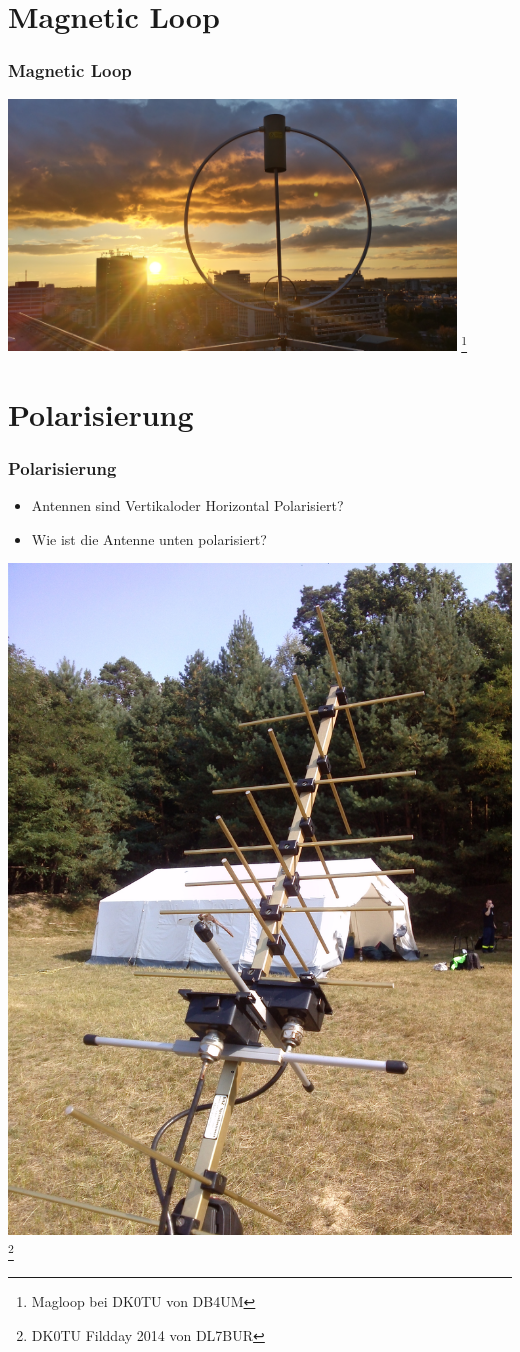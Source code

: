\section*{Magnetic Loop}

\begin{frame}
    \frametitle{Magnetic Loop}
    \begin{center}
        \includegraphics[width=0.89\textwidth]{e11/Magloop.jpg}
        \footnote{\tiny Magloop bei DK0TU von DB4UM}
	\end{center}
\end{frame}

\section*{Polarisierung}

\begin{frame}
    \frametitle{Polarisierung}
    	\begin{itemize}
		\item Antennen sind Vertikaloder Horizontal Polarisiert?
		\item Wie ist die Antenne unten polarisiert?
    \end{itemize}
    \begin{center}
        \includegraphics[width=.3\textwidth]{e11/kreutzYagi.jpg}
        \footnote{\tiny DK0TU Fildday 2014 von DL7BUR}
	\end{center}
\end{frame}

